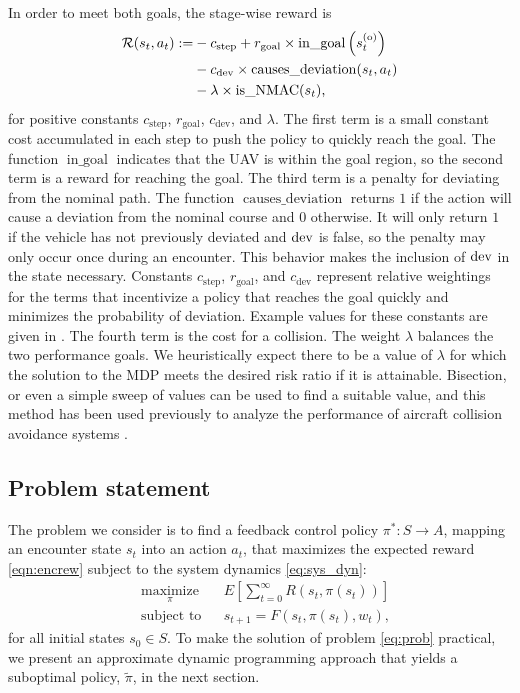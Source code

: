 In order to meet both goals, the stage-wise reward is
\begin{align}\label{eqn:rew}
    \mathcal{R}(s_t, a_t) := & - c_\text{step} + r_\text{goal} \times \operatorname{in\_goal}\left(s^{(\mathrm{o})}_t\right) \nonumber\\
             & - c_\text{dev} \times \operatorname{causes\_deviation}(s_t, a_t) \nonumber\\
             & - \lambda \times \operatorname{is\_NMAC}(s_t) \text{,}
\end{align}
for positive constants $c_\text{step}$, $r_\text{goal}$, $c_\text{dev}$,  and $ \lambda$. The first term is a small constant cost accumulated in each step to push the policy to quickly reach the goal. The function $\operatorname{in\_goal}$ indicates that the UAV is within the goal region, so the second term is a reward for reaching the goal. The third term is a penalty for deviating from the nominal path. The function $\operatorname{causes\_deviation}$ returns $1$ if the action will cause a deviation from the nominal course and $0$ otherwise. It will only return $1$ if the vehicle has not previously deviated and $\mathrm{dev }$ is false, so the penalty may only occur once during an encounter. This behavior makes the inclusion of $\mathrm{dev }$ in the state necessary. Constants $c_\text{step}$, $r_\text{goal}$, and $c_\text{dev} $ represent relative weightings for the terms that incentivize a policy that reaches the goal quickly and minimizes the probability of deviation. Example values for these constants  are given in . The fourth term is the cost for a collision. The weight $\lambda$ balances the two performance goals. We heuristically expect there to be a value of $\lambda$ for which the solution to the MDP meets the desired risk ratio if it is attainable. Bisection, or even a simple sweep of values can be used to find a suitable value, and this method has been used previously to analyze the performance of aircraft collision avoidance systems \cite{HB-DH-MJK-WSL:12,MJK-JPC:11}.

\subsection{Problem statement}
The problem we consider  is to find a feedback control policy $\pi^*: S \to A$, mapping an encounter state $s_t$ into an action $a_t$,  that maximizes the expected reward \eqref{eqn:encrew} subject to the system dynamics \eqref{eq:sys_dyn}:
\begin{equation}\label{eq:prob}
\begin{aligned}
& \underset{\pi}{\text{maximize}}
& & E \left[\sum_{t=0}^\infty R(s_t, \pi(s_t))\right] \\
& \text{subject to}
& & s_{t+1} = F(s_t, \pi(s_t), w_t) \text{,}
\end{aligned}
\end{equation}
for all initial states $s_0 \in S$. To make the solution of problem \eqref{eq:prob} practical, we present an approximate dynamic programming approach that yields a suboptimal policy, $\tilde{\pi}$, in the next section.

